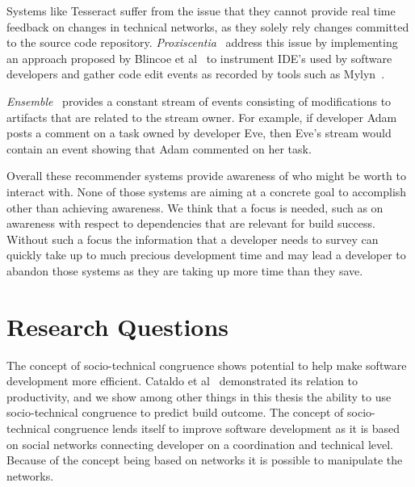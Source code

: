 Systems like Tesseract suffer from the issue that they cannot provide real time feedback on changes in  technical networks, as they solely rely changes committed to the source code repository. 
\emph{Proxiscentia}~\cite{borici:chase:2012} address this issue by implementing an approach proposed by Blincoe et al~\cite{blincoe:cscw:2012} to instrument IDE's used by software developers and gather code edit events as recorded by tools such as Mylyn~\cite{kersten:aosd:2005}.

\emph{Ensemble}~\cite{xiang:rsse:2008} provides a constant stream of events consisting of modifications to artifacts that are related to the stream owner.
For example, if developer Adam posts a comment on a task owned by developer Eve, then Eve's stream would contain an event showing that Adam commented on her task.

Overall these recommender systems provide awareness of who might be worth to interact with.
None of those systems are aiming at a concrete goal to accomplish other than achieving awareness.
We think that a focus is needed, such as on awareness with respect to dependencies that are relevant for build success.
Without such a focus the information that a developer needs to survey can quickly take up to much precious development time and may lead a developer to abandon those systems as they are taking up more time than they save.





\section{Research Questions}
The concept of socio-technical congruence shows potential to help make software development more efficient.
Cataldo et al~\cite{cataldo:cscw:2006} demonstrated its relation to productivity, and we show among other things in this thesis the ability to use socio-technical congruence to predict build outcome.
The concept of socio-technical congruence lends itself to improve software development as it is based on social networks connecting developer on a coordination and technical level.
Because of the concept being based on networks it is possible to manipulate the networks.

